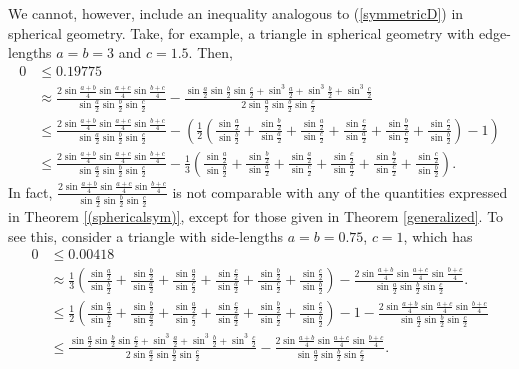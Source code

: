 \documentclass[12pt,notitlepage]{amsart}%
\newcommand{\s}[1]{\sin \frac{#1}{2}}
\newcommand{\f}[1]{\sin \frac{#1}{4}}
\newcommand{\fracsyms}{\frac{\s{a}}{\s{b}}+\frac{\s{b}}{\s{a}}+\frac{\s{a}}{\s{c}}+\frac{\s{c}}{\s{a}}+\frac{\s{b}}{\s{c}}+\frac{\s{c}}{\s{b}}}
\begin{document}
We cannot, however, include an inequality analogous to (\ref{symmetricD}) in spherical geometry. Take, for example, a triangle in spherical geometry with edge-lengths $a=b=3$ and $c=1.5$. Then,
\begin{align*}
	0&\leq 0.19775\\
	&\approx \frac{2\sin\frac{a+b}{4}\sin\frac{a+c}{4}\sin\frac{b+c}{4}}{\s{a}\s{b}\s{c}}-\frac{\s{a}\s{b}\s{c}+\sin^3\frac{a}{2}+\sin^3\frac{b}{2}+\sin^3\frac{c}{2}}{2\s{a}\s{b}\s{c}}\\
	&\leq\frac{2\sin\frac{a+b}{4}\sin\frac{a+c}{4}\sin\frac{b+c}{4}}{\s{a}\s{b}\s{c}}-\left(\frac{1}{2}(\fracsyms)-1\right)\\
    &\leq \frac{2\sin\frac{a+b}{4}\sin\frac{a+c}{4}\sin\frac{b+c}{4}}{\s{a}\s{b}\s{c}}-\frac{1}{3}\left( \fracsyms\right).
\end{align*}
In fact, $\frac{2\sin\frac{a+b}{4}\sin\frac{a+c}{4}\sin\frac{b+c}{4}}{\s{a}\s{b}\s{c}}$ is not comparable with any of the quantities expressed in Theorem \ref{(sphericalsym)}, except for those given in Theorem \ref{generalized}. To see this, consider a triangle with side-lengths $a=b=0.75$, $c=1$, which has
\begin{align*}
	0&\leq0.00418\\
    &\approx\frac{1}{3}\left( \fracsyms\right)-\frac{2\f{a+b}\f{a+c}\f{b+c}}{\s{a}\s{b}\s{c}}.\\
    &\leq\frac{1}{2}\left( \fracsyms\right)-1-\frac{2\f{a+b}\f{a+c}\f{b+c}}{\s{a}\s{b}\s{c}}\\
    &\leq\frac{\s{a}\s{b}\s{c}+\sin^3\frac{a}{2}+\sin^3\frac{b}{2}+\sin^3\frac{c}{2}}{2\s{a}\s{b}\s{c}}-\frac{2\f{a+b}\f{a+c}\f{b+c}}{\s{a}\s{b}\s{c}}.
\end{align*}
\end{document}
